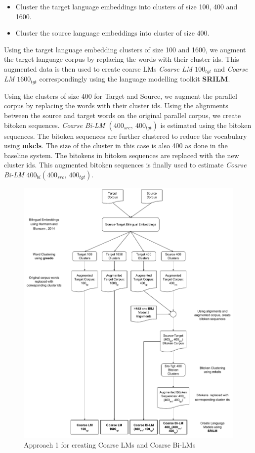 \begin{itemize}
	\item Cluster the target language embeddings into clusters of size 100, 400 and 1600.
	\item Cluster the source language embeddings into cluster of size 400. 
\end{itemize}

Using the target language embedding clusters of size 100 and 1600, we augment the target language corpus by replacing the words with their cluster ids. This augmented data is then used to create coarse LMs \textit{Coarse LM $100_{tgt}$} and \textit{Coarse LM $1600_{tgt}$} correspondingly using the language modelling toolkit \textbf{SRILM}.

Using the clusters of size 400 for Target and Source, we augment the parallel corpus by replacing the words with their cluster ids. Using the alignments between the source and target words on the original parallel corpus, we create bitoken sequences. \textit{Coarse Bi-LM $(400_{src},\ 400_{tgt})$} is estimated using the bitoken sequences. The bitoken sequences are further clustered to reduce the vocabulary using \textbf{mkcls}. The size of the cluster in this case is also 400 as done in the baseline system. The bitokens in bitoken sequences are replaced with the new cluster ids. This augmented bitoken sequences is finally used to estimate \textit{Coarse Bi-LM $400_{bi}(400_{src},\ 400_{tgt})$}.

\begin{figure}[htbp]
	\begin{center}
		\includegraphics[width=\textwidth]{files/images/idea1}
	\end{center}
	\caption{Approach 1 for creating Coarse LMs and Coarse Bi-LMs}
	\label{fig:idea1}
\end{figure}

